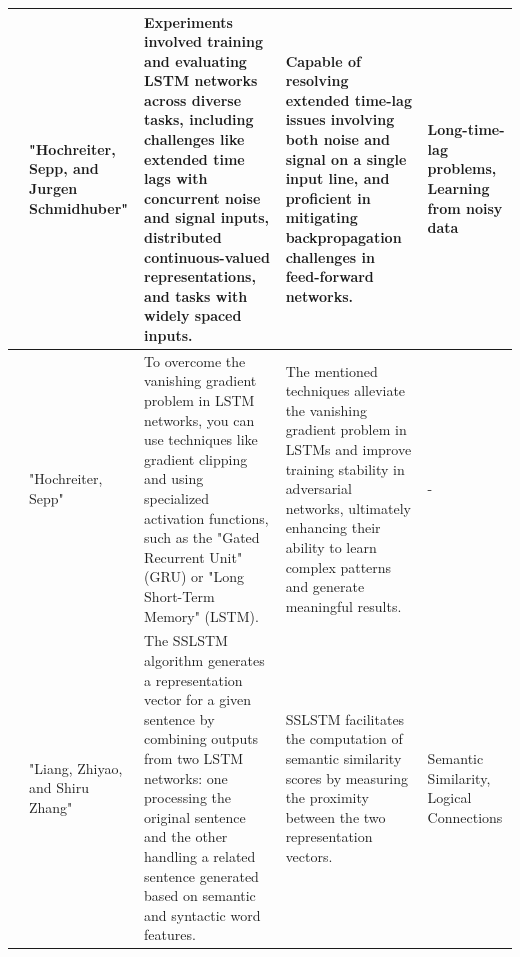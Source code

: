 \documentclass[fleqn,10pt]{thescipub} %
\begin{document}
\begin{table}
\begin{center}
\begin{tabular}{ |p{1cm}|p{2cm}|p{4cm}|p{4cm}|p{4cm}| }
\hline
[15] &  "Hochreiter, Sepp, and Jurgen Schmidhuber" & Experiments involved training and evaluating LSTM networks across diverse tasks, including challenges like extended time lags with concurrent noise and signal inputs, distributed continuous-valued representations, and tasks with widely spaced inputs. & Capable of resolving extended time-lag issues involving both noise and signal on a single input line, and proficient in mitigating backpropagation challenges in feed-forward networks. &  Long-time-lag problems, Learning from noisy data  \\
\hline
[16] &  "Hochreiter, Sepp" &  To overcome the vanishing gradient problem in LSTM networks, you can use techniques like gradient clipping and using specialized activation functions, such as the "Gated Recurrent Unit" (GRU) or "Long Short-Term Memory" (LSTM). &  The mentioned techniques alleviate the vanishing gradient problem in LSTMs and improve training stability in adversarial networks, ultimately enhancing their ability to learn complex patterns and generate meaningful results. & -  \\
\hline
[17]  &  "Liang, Zhiyao, and Shiru Zhang" &  The SSLSTM algorithm generates a representation vector for a given sentence by combining outputs from two LSTM networks: one processing the original sentence and the other handling a related sentence generated based on semantic and syntactic word features. &  SSLSTM facilitates the computation of semantic similarity scores by measuring the proximity between the two representation vectors. &  Semantic Similarity, Logical Connections  \\
\hline
\end{tabular}
\end{center}
\end{table}
\end{document}
